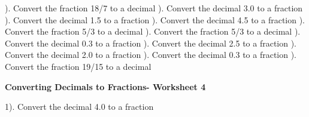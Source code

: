 \documentclass{article}%
\begin{document}
\newline%
). Convert the fraction 18/7 to a decimal%
\newline%
\newline%
). Convert the decimal 3.0 to a fraction%
\newline%
\newline%
). Convert the decimal 1.5 to a fraction%
\newline%
\newline%
). Convert the decimal 4.5 to a fraction%
\newline%
\newline%
). Convert the fraction 5/3 to a decimal%
\newline%
\newline%
). Convert the fraction 5/3 to a decimal%
\newline%
\newline%
). Convert the decimal 0.3 to a fraction%
\newline%
\newline%
). Convert the decimal 2.5 to a fraction%
\newline%
\newline%
). Convert the decimal 2.0 to a fraction%
\newline%
\newline%
). Convert the decimal 0.3 to a fraction%
\newline%
\newline%
). Convert the fraction 19/15 to a decimal%
\newline%
\newline%
\newline%
\pagebreak%
\large%
\begin{center}%
\textbf{Converting Decimals to Fractions- Worksheet 4}%
\newline%
\end{center} \normalsize%
1). Convert the decimal 4.0 to a fraction%
\newline%
\newline%
\end{document}
